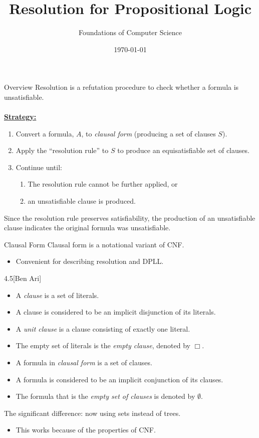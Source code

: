 \documentclass[style=sailor,size=12pt]{powerdot}
\title{Resolution for Propositional Logic}
\author{Foundations of Computer Science}
\date{\today}
\begin{document}
\maketitle

\begin{wideslide}[bm=,toc=]{Overview}
Resolution is a refutation procedure to check whether a formula is
unsatisfiable.\\
~\\
{\bf \underline{Strategy:}}\\
\begin{enumerate}
\item Convert a formula, $A$, to \emph{clausal form} (producing a set of clauses $S$).
\item Apply the ``resolution rule'' to $S$ to produce an equisatisfiable set of
clauses.
\item Continue until:
\begin{enumerate}
\item The resolution rule cannot be further applied, or
\item an unsatisfiable clause is produced.
\end{enumerate}
\end{enumerate}
Since the resolution rule preserves satisfiability, the production of an
unsatisfiable clause indicates the original formula was unsatisfiable.
\end{wideslide}

\begin{wideslide}[bm=,toc=]{Clausal Form}
Clausal form is a notational variant of CNF.
\begin{itemize}
\item Convenient for describing resolution and DPLL.
\end{itemize}

\begin{defn}{4.5}[Ben Ari]
\end{defn}
\vspace*{-3ex}
\begin{itemize}
\item A \emph{clause} is a set of literals.  
\item A clause is considered to be an implicit disjunction of its literals.
\item A \emph{unit clause} is a clause consisting of exactly one literal.
\item The empty set of literals is the \emph{empty clause}, denoted by $\Box$.
\item A formula in \emph{clausal form} is a set of clauses.
\item A formula is considered to be an implicit conjunction of its clauses.
\item The formula that is the \emph{empty set of clauses} is denoted by
$\emptyset$.
\end{itemize}

The significant difference: now using sets instead of trees.
\begin{itemize}
\item This works because of the properties of CNF. 
\end{itemize}
\end{wideslide}
\end{document}
